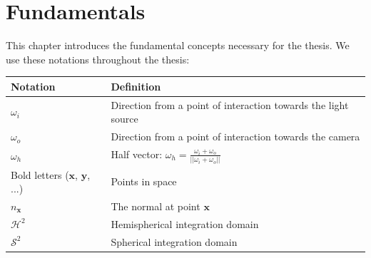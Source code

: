 \chapter{Fundamentals}
\label{chap:fundamentals}
This chapter introduces the fundamental concepts necessary for the thesis.
We use these notations throughout the thesis:
\begin{center}
    \begin{tabular}{ l  l }
        Notation & Definition \\
        \hline
        $\omega_i$ & Direction from a point of interaction towards the light source \\
        $\omega_o$ & Direction from a point of interaction towards the camera \\
        $\omega_h$ & Half vector: $\omega_h=\frac{\omega_i + \omega_o}{||\omega_i + \omega_o||}$ \\
        Bold letters ($\boldsymbol{x}$, $\boldsymbol{y}$, ...) & Points in space \\
        $n_{\boldsymbol{x}}$ & The normal at point $\boldsymbol{x}$ \\
        $\mathcal{H}^2$ & Hemispherical integration domain \\
        $\mathcal{S}^2$ & Spherical integration domain \\
    \end{tabular}
\end{center}

